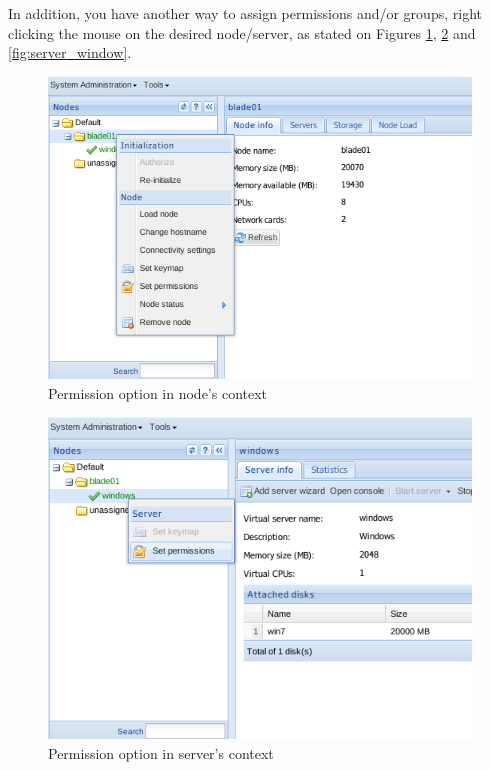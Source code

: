 In addition, you have another way to assign permissions and/or groups, right clicking the mouse on the desired node/server, as stated on Figures \ref{fig:context_dc}, \ref{fig:context_server} and \ref{fig:server_window}.

\begin{figure}[H]
        \begin{center}
        \includegraphics[scale=0.5]{screenshots/permissions/context_dc.png}
        \caption{Permission option in node's context}
        \label{fig:context_dc}
        \end{center}
\end{figure}

\begin{figure}[H]
        \begin{center}
        \includegraphics[scale=0.5]{screenshots/permissions/context_server.png}
        \caption{Permission option in server's context}
        \label{fig:context_server}
        \end{center}
\end{figure}

